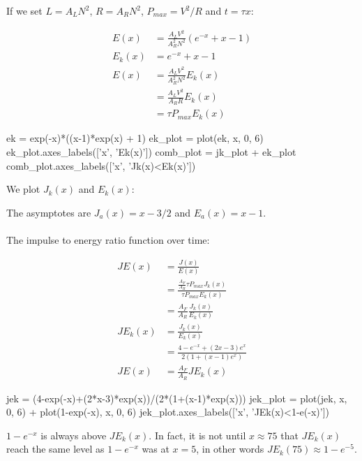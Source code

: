 \documentclass[]{../common/elementary-physics}
\begin{document}
If we set $L = A_L N^2$, $R = A_R N^2$, $P_{max} = V^2 / R$ and  $t = \tau x$:

\begin{subequations}
\begin{align}
E(x) &= \frac{A_L V^2}{A_R^2 N^2} (e^{-x}+x-1) \\
E_k(x) &= e^{-x}+x-1 \\
E(x) &= \frac{A_L V^2}{A_R^2 N^2} E_k(x) \\
&= \frac{A_L V^2}{A_R R} E_k(x) \\
&= \tau P_{max} E_k(x)
\end{align}
\end{subequations}

\begin{sagesilent}
ek = exp(-x)*((x-1)*exp(x) + 1)
ek_plot = plot(ek, x, 0, 6)
ek_plot.axes_labels(['x', 'Ek(x)'])
comb_plot = jk_plot + ek_plot
comb_plot.axes_labels(['x', 'Jk(x)<Ek(x)'])
\end{sagesilent}

We plot $J_k(x)$ and $E_k(x)$:


The asymptotes are $J_a(x) = x-3/2$ and $E_a(x) = x - 1$.\\
\\
The impulse to energy ratio function over time:

\begin{subequations}
\begin{align}
JE(x) &= \frac{J(x)}{E(x)} \\
&= \frac{\frac{A_F}{A_R} \tau P_{max} J_k(x)}{\tau P_{max} E_k(x)} \\
&= \frac{A_F}{A_R} \frac{J_k(x)}{E_k(x)} \\
JE_k(x) &= \frac{J_k(x)}{E_k(x)} \\
&= \frac{4-e^{-x}+(2x-3)e^x}{2(1+(x-1)e^x)} \\
JE(x) &= \frac{A_F}{A_R} JE_k(x)
\end{align}
\end{subequations}

\begin{sagesilent}
jek = (4-exp(-x)+(2*x-3)*exp(x))/(2*(1+(x-1)*exp(x)))
jek_plot = plot(jek, x, 0, 6) + plot(1-exp(-x), x, 0, 6)
jek_plot.axes_labels(['x', 'JEk(x)<1-e(-x)'])
\end{sagesilent}


$1-e^{-x}$ is always above $JE_k(x)$.
In fact, it is not until $x \approx 75$ that $JE_k(x)$ reach the same level as $1-e^{-x}$ was at $x = 5$, in other words $JE_k(75) \approx 1-e^{-5}$.
\end{document}

